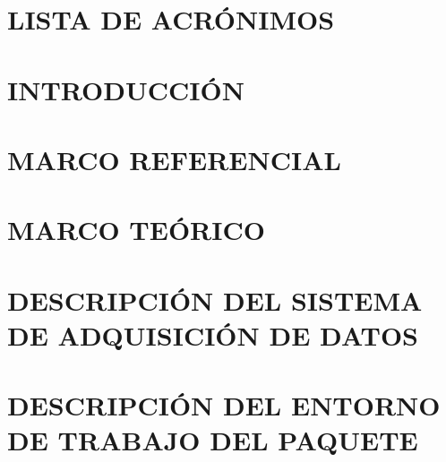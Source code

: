\documentclass[letterpaper,titlepage,12pt,oneside,spanish,final]{report_eie}
\numberwithin{equation}{chapter}%
\numberwithin{figure}{chapter}%
\numberwithin{table}{chapter}%
\numberwithin{definition}{chapter}%
\numberwithin{lemma}{chapter}%
\numberwithin{theorem}{chapter}%
\numberwithin{corollary}{chapter}%
\numberwithin{condition}{chapter}%
\numberwithin{criterion}{chapter}%
\numberwithin{problem}{chapter}%
\numberwithin{property}{chapter}%
\numberwithin{proposition}{chapter}%
\numberwithin{solution}{chapter}%
\numberwithin{conjecture}{chapter}%
\begin{document}
%
\thispagestyle{empty}%
\newpage
\addtocounter{page}{3}%
\setlength{\parskip}{3pt}%
\tableofcontents%
\listoffigures%
\listoftables%

\newpage

\chapter*{LISTA DE ACRÓNIMOS}%
%
%

\justifying
\chapter*{INTRODUCCIÓN}\label{CAP:intro}
\setlength{\parskip}{14pt}%
%

%
%

\chapter{MARCO REFERENCIAL}\label{CAP:marcoref}
%

\chapter{MARCO TEÓRICO}\label{CAP:teor}
%

\chapter{DESCRIPCIÓN DEL SISTEMA DE ADQUISICIÓN DE DATOS}\label{CAP:hardware}
%

\chapter{DESCRIPCIÓN DEL ENTORNO DE TRABAJO DEL PAQUETE}\label{CAP:entorno}
  
\end{document}
